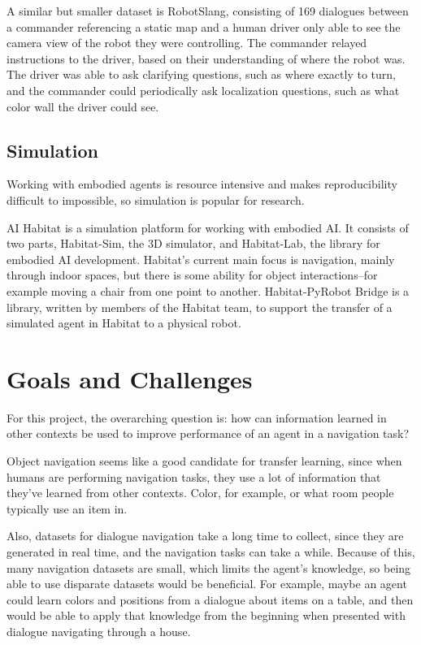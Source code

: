 \documentclass{article}
\begin{document}
A similar but smaller dataset is RobotSlang, consisting of 169 dialogues between a commander referencing a static map and a human driver only able to see the camera view of the robot they were controlling\cite{robotslang}. The commander relayed instructions to the driver, based on their understanding of where the robot was. The driver was able to ask clarifying questions, such as where exactly to turn, and the commander could periodically ask localization questions, such as what color wall the driver could see.

\subsection{Simulation}
Working with embodied agents is resource intensive and makes reproducibility difficult to impossible, so simulation is popular for research. 

AI Habitat is a simulation platform for working with embodied AI\cite{habitat19iccv}. It consists of two parts, Habitat-Sim, the 3D simulator, and Habitat-Lab, the library for embodied AI development. Habitat's current main focus is navigation, mainly through indoor spaces, but there is some ability for object interactions--for example moving a chair from one point to another. Habitat-PyRobot Bridge is a library, written by members of the Habitat team, to support the transfer of a simulated agent in Habitat to a physical robot\cite{Kadian_2020}. 

\section{Goals and Challenges}
For this project, the overarching question is: how can information learned in other contexts be used to improve performance of an agent in a navigation task?

Object navigation seems like a good candidate for transfer learning, since when humans are performing navigation tasks, they use a lot of information that they've learned from other contexts. Color, for example, or what room people typically use an item in. 

Also, datasets for dialogue navigation take a long time to collect, since they are
generated in real time, and the navigation tasks can take a while. Because of this, many navigation datasets are small, which limits the agent's knowledge, so being able to use disparate datasets would be beneficial. For example, maybe an agent could learn colors and positions from a dialogue about items on a table, and then would be able to apply that knowledge from the beginning when presented with dialogue navigating through a house. 
\end{document}
